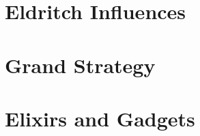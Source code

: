 \documentclass[./main.tex]{subfiles}
\begin{document}
\chapter{Eldritch Influences}



\chapter{Grand Strategy}

\chapter{Elixirs and Gadgets}


\end{document}

